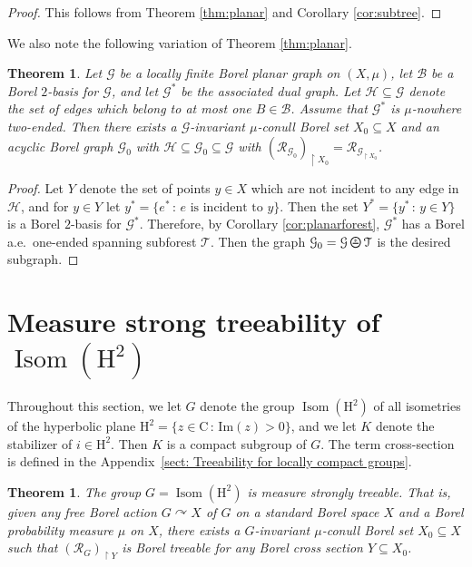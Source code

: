 \documentclass[11pt]{amsart}
\theoremstyle{definition}
\theoremstyle{plain}
\newtheorem{theorem}[definition]{Theorem}
\newcommand{\<}{\langle}
\renewcommand{\>}{\rangle}
\newcommand{\mc}[1]{\mathcal{#1}}
\DeclareMathOperator{\Isom}{Isom}
\newcommand{\HH}{\bm{\mathrm{H}}}
\newcommand{\C}{\bm{\mathrm{C}}}
\newcommand{\Ggraph}{\mathcal{G}}
\newcommand{\Hgraph}{\mathcal{H}}
\newcommand{\Tgraph}{\mathcal{T}}
\newcommand\RR{\mathscr{R}}
\newcommand{\oPerpStar}{\begin{tikzpicture}[scale=0.134]
\draw[thick,line width=0.7pt](-0.6,-0.2)--(0.6,-0.2) ;
    \draw (0,0.1) node[scale=0.6] {\rm{*}};
  \draw[line width=0.7pt] (0,0) circle [radius=1];
\end{tikzpicture}}
\newcommand{\oPerpstar}{\mathbin{\raisebox{-1pt}{\oPerpStar}}}
\begin{document}
\begin{proof}
This follows from Theorem \ref{thm:planar} and Corollary \ref{cor:subtree}.
\end{proof}

We also note the following variation of Theorem \ref{thm:planar}.

\begin{theorem}\label{thm:varplanar}
Let ${\Ggraph}$ be a locally finite Borel planar graph on $(X,\mu )$, let $\mc{B}$ be a Borel $2$-basis for $\Ggraph$, and let $\Ggraph ^*$ be the associated dual
graph. Let $\Hgraph \subseteq \Ggraph$ denote the set of edges which
belong to at most one $B\in \mc{B}$. Assume that $\Ggraph ^*$ is $\mu$-nowhere two-ended. Then there exists a $\Ggraph$-invariant $\mu$-conull Borel set $X_0\subseteq X$ and an acyclic Borel graph ${\Ggraph}_0$ with $\Hgraph \subseteq \Ggraph _0 \subseteq {\Ggraph}$ with $(\RR_{\Ggraph_0})_{\restriction X_0} = \RR_{{\Ggraph}_{\restriction X_0}}$.
\end{theorem}

\begin{proof}
Let $Y$ denote the set of points $y\in X$ which are not incident to any edge in $\Hgraph$, and for $y\in Y$ let $y^* = \{ e^* \, : \, e\text{ is incident to }y \}$. Then the set $Y^* = \{ y^* \, : \, y\in Y \}$ is a Borel $2$-basis for $\Ggraph ^*$. Therefore, by Corollary \ref{cor:planarforest}, $\Ggraph ^*$ has a Borel a.e.\ one-ended spanning subforest $\Tgraph$. Then the graph $\Ggraph _0 = \Ggraph \oPerpstar \Tgraph$ is the desired subgraph.
\end{proof}


\section{\texorpdfstring{Measure strong treeability of $\Isom(\HH ^2)$}{Measure strong treeability of H2}}

Throughout this section, we let $G$ denote the group $\Isom(\HH ^2)$ of all
isometries of the hyperbolic plane $\HH ^2 = \{ z\in \C \, : \, \mathrm{Im}(z) > 0 \}$, and we let $K$ denote the stabilizer of $i\in \HH ^2$. Then $K$ is a compact subgroup of $G$.
The term cross-section is defined in the Appendix~\ref{sect: Treeability for locally compact groups}.


\begin{theorem}\label{thm: Isom H2 meas tree}
The group $G=\Isom(\HH ^2)$ is measure strongly treeable. That is, given any free Borel action $G\curvearrowright X$ of $G$ on a standard Borel space $X$ and a Borel probability measure $\mu$ on $X$, there exists a $G$-invariant $\mu$-conull Borel set $X_0\subseteq X$ such that $(\RR_{G})_{\restriction Y}$ is Borel treeable for any Borel cross section $Y\subseteq X_0$.
\end{theorem}
\end{document}
